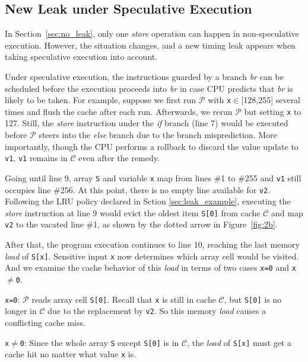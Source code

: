 \documentclass[sigconf]{acmart}
\newcommand{\prog}{\mathcal{P}}
\begin{document}
\subsection{New Leak under Speculative Execution}
\label{sec:specu_leak}

In Section~\ref{sec:no_leak}, only one \textit{store} operation can happen 
in non-speculative execution. However, the situation changes, and a new timing 
leak appears when taking speculative execution into account.  


Under speculative execution, the instructions guarded by a branch \emph{br} can 
be scheduled before the execution proceeds into \emph{br} in case CPU predicts 
that \emph{br} is likely to be taken. For example, suppose we first run $\prog$ 
with \texttt{x}$\in$[128,255] several times and flush the cache after each run. 
Afterwards, we rerun $\prog$ but setting \texttt{x} to 127. Still, the 
\textit{store} instruction under the \emph{if} branch (line 7) would be executed 
before $\prog$ steers into the \emph{else} branch due to the branch misprediction. 
More importantly, though the CPU performs a rollback to discard the value update 
to \texttt{v1}, \texttt{v1} remains in $\mathcal{C}$ even after the remedy. 


Going until line 9, array \texttt{S} and variable \texttt{x} map from lines \#1 
to \#255 and \texttt{v1} still occupies line \#256. At this point, there is no 
empty line available for \texttt{v2}. Following the LRU policy declared in Sction
\ref{sec:leak_example}, executing the \textit{store} instruction at line 9 would 
evict the oldest item \texttt{S[0]} from cache $\mathcal{C}$ and map \texttt{v2} 
to the vacated line \#1, as shown by the dotted arrow in Figure~\ref{fig:2b}.


After that, the program execution continues to line 10, reaching the last memory 
\textit{load} of \texttt{S[x]}. Sensitive input \texttt{x} now determines which 
array cell would be visited. And we examine the cache behavior of this \textit{load} 
in terms of two cases \texttt{x=0} and \texttt{x$\neq$0}.


\begin{itemize*}
  \item \texttt{x=0}: $\prog$ reads array cell \texttt{S[0]}. Recall that \texttt{x} 
	is still in cache $\mathcal{C}$, but \texttt{S[0]} is no longer in $\mathcal{C}$ 
	due to the replacement by \texttt{v2}. So this memory \textit{load}	causes a 
	conflicting cache miss.
  \item \texttt{x$\neq$0}: Since the whole array \texttt{S} except \texttt{S[0]}
    is in $\mathcal{C}$, the \textit{load} of \texttt{S[x]} must get a cache hit 
	no matter what value \texttt{x} is.
\end{itemize*}
\end{document}
